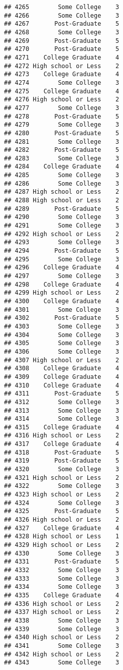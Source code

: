 \documentclass[
]{article}
\begin{document}
\begin{verbatim}
## 4265        Some College    3
## 4266        Some College    3
## 4267       Post-Graduate    5
## 4268        Some College    3
## 4269       Post-Graduate    5
## 4270       Post-Graduate    5
## 4271    College Graduate    4
## 4272 High school or Less    2
## 4273    College Graduate    4
## 4274        Some College    3
## 4275    College Graduate    4
## 4276 High school or Less    2
## 4277        Some College    3
## 4278       Post-Graduate    5
## 4279        Some College    3
## 4280       Post-Graduate    5
## 4281        Some College    3
## 4282       Post-Graduate    5
## 4283        Some College    3
## 4284    College Graduate    4
## 4285        Some College    3
## 4286        Some College    3
## 4287 High school or Less    2
## 4288 High school or Less    2
## 4289       Post-Graduate    5
## 4290        Some College    3
## 4291        Some College    3
## 4292 High school or Less    2
## 4293        Some College    3
## 4294       Post-Graduate    5
## 4295        Some College    3
## 4296    College Graduate    4
## 4297        Some College    3
## 4298    College Graduate    4
## 4299 High school or Less    2
## 4300    College Graduate    4
## 4301        Some College    3
## 4302       Post-Graduate    5
## 4303        Some College    3
## 4304        Some College    3
## 4305        Some College    3
## 4306        Some College    3
## 4307 High school or Less    2
## 4308    College Graduate    4
## 4309    College Graduate    4
## 4310    College Graduate    4
## 4311       Post-Graduate    5
## 4312        Some College    3
## 4313        Some College    3
## 4314        Some College    3
## 4315    College Graduate    4
## 4316 High school or Less    2
## 4317    College Graduate    4
## 4318       Post-Graduate    5
## 4319       Post-Graduate    5
## 4320        Some College    3
## 4321 High school or Less    2
## 4322        Some College    3
## 4323 High school or Less    2
## 4324        Some College    3
## 4325       Post-Graduate    5
## 4326 High school or Less    2
## 4327    College Graduate    4
## 4328 High school or Less    1
## 4329 High school or Less    2
## 4330        Some College    3
## 4331       Post-Graduate    5
## 4332        Some College    3
## 4333        Some College    3
## 4334        Some College    3
## 4335    College Graduate    4
## 4336 High school or Less    2
## 4337 High school or Less    2
## 4338        Some College    3
## 4339        Some College    3
## 4340 High school or Less    2
## 4341        Some College    3
## 4342 High school or Less    2
## 4343        Some College    3

\end{verbatim}
\end{document}

